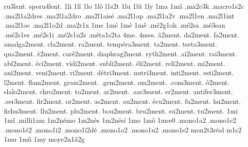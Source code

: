 {      ru3lent.
   sporu4lent.
%
1li
1l\^i
1lo
1l\^o
l1s2t
1lu
1l\^u
1ly
1ma
1m\^a
                    .ma2c3k
                    .macro1s2c
                    .ma2l1a2dres
                    .ma2l1a2dro
                    .ma2l1ais\'e
                    .ma2l1ap
                    .ma2l1a2v
                    .ma2l1en
                    .ma2l1int
                    .ma2l1oc
                    .ma2l1o2d
                    .ma2r1x %
1me
1m\'e
1m\`e
1m\^e
                    .m\'e2g1oh
                    .m\'e2sa %
                    .m\'e3san %
                    .m\'e2s1es
                    .m\'e2s1i
                    .m\'e2s1u2s
                    .m\'eta1s2ta
4me.
4mes.
      \^a2ment.
       da2ment.
       fa2ment.
   amalga2ment.
      cla2ment.
       ra2ment.
temp\'era3ment.
       ta2ment.
    testa3ment.
      qua2ment.
      \`e2ment.
   car\^e2ment.
 diaphrag2ment.
     ryth2ment.
       ai2ment.
      rai3ment.
   ab\^i2ment.
    \'eci2ment.
     vidi2ment.
    subli2ment.
    \'eli2ment.
     reli2ment.
       mi2ment.
      ani2ment.
     veni2ment.
       ri2ment.
  d\'etri3ment.
    nutri3ment.
     inti2ment.
     esti2ment.
        l2ment.
     flam2ment.
     gram2ment.
     .gem2ment.
       om2ment.
     .com3ment.
      \^o2ment.
    slalo2ment.
     chro2ment.
       to2ment.
       ar2ment.
     .sar3ment.
       er2ment.
  antifer3ment.
     .ser3ment.
      fir2ment.
       or2ment.
       as2ment.
       au2ment.
    \'ecu2ment.
       fu2ment.
       hu2ment.
    fichu3ment.
      llu2ment.
      plu2ment.
      bou2ment.
      bru2ment.
       su2ment.
       tu2ment.
%
1mi
1m\^i
                    .milli1am
                    1m2n\'emo
                    1m2n\`es
                    1m2n\'esi
1mo
1m\^o
1m\oe0 %
                    .mono1a2
                    .mono1e2
                    .mono1\'e2
                    .mono1i2
                    .mono1\"i2d\'e
                    .mono1o2
                    .mono1u2
                    .mono1s2
                    mon2t3r\'eal %
m1s2
1mu
1m\^u
1my
                    moye2n1\^a2g
}
